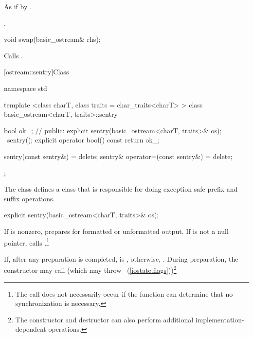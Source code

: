 \begin{itemdescr}
\pnum
\effects As if by .

\pnum
\returns {}.
\end{itemdescr}

%
%
\begin{itemdecl}
void swap(basic_ostream& rhs);
\end{itemdecl}

\begin{itemdescr}
\pnum
\effects Calls .
\end{itemdescr}

[ostream::sentry]{Class }

%
\begin{codeblock}
namespace std {
  template <class charT, class traits = char_traits<charT> >
  class basic_ostream<charT, traits>::sentry {
    bool ok_; // \expos
  public:
    explicit sentry(basic_ostream<charT, traits>& os);
    ~sentry();
    explicit operator bool() const { return ok_; }

    sentry(const sentry&) = delete;
    sentry& operator=(const sentry&) = delete;
  };
}
\end{codeblock}

\pnum
The class
defines a class that is responsible for doing exception safe prefix and suffix
operations.

%
\begin{itemdecl}
explicit sentry(basic_ostream<charT, traits>& os);
\end{itemdecl}

\begin{itemdescr}
\pnum
If
is nonzero, prepares for formatted or unformatted output.
If
is not a null pointer, calls
%
.\footnote{The call
does not necessarily occur if the function can determine that no
synchronization is necessary.}

\pnum
If, after any preparation is completed,
is
,
otherwise,
.
During preparation, the constructor may call
(which may throw
~(\ref{iostate.flags}))\footnote{The
constructor and destructor
can also perform additional
implementation-dependent operations.}
\end{itemdescr}

